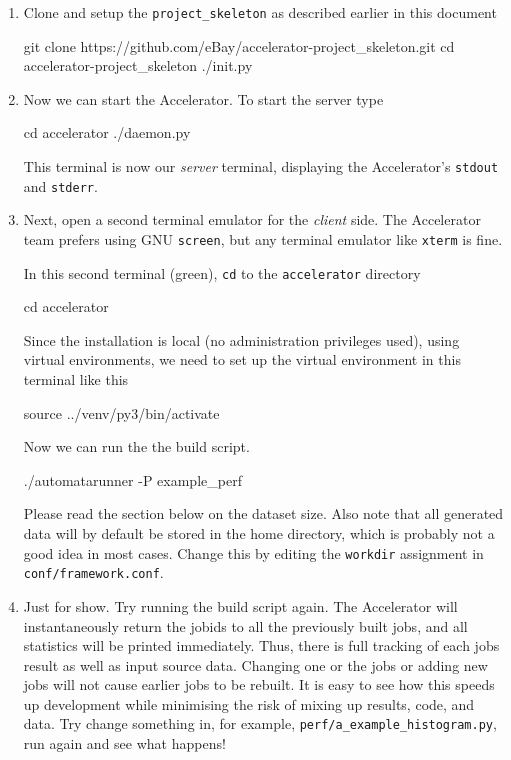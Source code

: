 \documentclass[a4paper]{article}
\begin{document}
\begin{enumerate}
\item Clone and setup the \texttt{project\_skeleton} as described
  earlier in this document
\begin{shell}
git clone https://github.com/eBay/accelerator-project_skeleton.git
cd accelerator-project_skeleton
./init.py
\end{shell}

\item Now we can start the Accelerator.  To start the server type
  \begin{shell}
cd accelerator
./daemon.py
  \end{shell}
  This terminal is now our \textsl{server} terminal, displaying the
  Accelerator's \texttt{stdout} and \texttt{stderr}.
  
\item Next, open a second terminal emulator for the \textsl{client}
  side.  The Accelerator team prefers using GNU \texttt{screen}, but any
  terminal emulator like \texttt{xterm} is fine.

  In this second terminal (green), \texttt{cd} to the
  \texttt{accelerator} directory
\begin{shell2}
cd accelerator
\end{shell2}
Since the installation is local (no administration privileges used),
using virtual environments, we need to set up the virtual environment
in this terminal like this
\begin{shell2}
source ../venv/py3/bin/activate
\end{shell2}
Now we can run the the build script.
\begin{shell2}
./automatarunner -P example_perf
\end{shell2}
Please read the section below on the dataset size.  Also note that all
generated data will by default be stored in the home directory, which
is probably not a good idea in most cases.  Change this by editing
the \texttt{workdir} assignment in \texttt{conf/framework.conf}.
\item Just for show.  Try running the build script again.  The
  Accelerator will instantaneously return the jobids to all the
  previously built jobs, and all statistics will be printed
  immediately.  Thus, there is full tracking of each jobs result as
  well as input source data.  Changing one or the jobs or adding new
  jobs will not cause earlier jobs to be rebuilt.  It is easy to see
  how this speeds up development while minimising the risk of mixing
  up results, code, and data.  Try change something in, for example,
  \texttt{perf/a\_example\_histogram.py}, run again and see what
  happens!
\end{enumerate}
\end{document}
